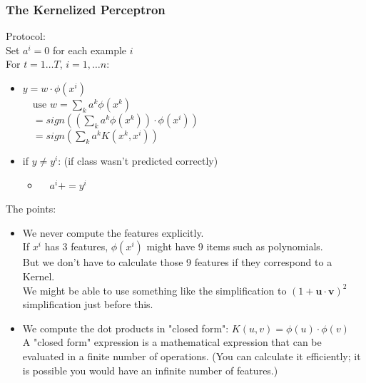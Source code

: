 \subsubsection{The Kernelized Perceptron} %

Protocol: \hfill \\
Set $a^i = 0$ for each example $i$ \hfill \\
For $t = 1 \dots T$, $i = 1, \dots n$:  \hfill \\
\begin{itemize}
	\item $ \displaystyle y = w \cdot \phi(x^i) $ \hfill \\
			 $ \displaystyle \quad \mbox{use } w = \sum_k a^k \phi(x^k) $  \hfill \\
			$ \displaystyle \quad = sign( ( \sum_k a^k \phi(x^k))  \cdot \phi(x^i))$  \hfill \\
			$ \displaystyle  \quad = sign( \sum_k a^k K(x^k, x^i) )$
	\item if $y \neq y^i$:  (if class wasn't predicted correctly)
	\begin{itemize}
		\item $ \quad a^i += y^i$
	\end{itemize}
\end{itemize}

The points: 
\begin{itemize}
	\item We never compute the features explicitly. \hfill \\
		If $x^i$ has 3 features, $\phi(x^i)$ might have 9 items such as polynomials.  \hfill \\
		But we don't have to calculate those 9 features if they correspond to a Kernel. \hfill \\
		We might be able to use something like the simplification to $(1 + \bm{u} \cdot \bm{v})^2$ 
			simplification just before this. 
	\item We compute the dot products in "closed form": $K(u, v) = \phi(u) \cdot \phi(v)$ \hfill \\
		A "closed form" expression is a mathematical expression that can 
			be evaluated in a finite number of operations.
		(You can calculate it efficiently; it is possible you would have an infinite number of features.)  %
 
\hfill \\

\end{itemize}

